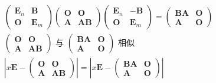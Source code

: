 \documentclass{article}
\begin{document}
				$$
				\begin{gathered}
					\left(\begin{array}{cc}
						\boldsymbol E_{n} & \boldsymbol B \\
						\boldsymbol O & \boldsymbol E_{m}
					\end{array}\right)\left(\begin{array}{cc}
						\boldsymbol O & \boldsymbol O \\
						\boldsymbol A & \boldsymbol A \boldsymbol B
					\end{array}\right)\left(\begin{array}{cc}
						\boldsymbol E_{n} & -\boldsymbol B \\
						\boldsymbol O & \boldsymbol E_{m}
					\end{array}\right)=\left(\begin{array}{cc}
						\boldsymbol B \boldsymbol A & \boldsymbol O \\
						\boldsymbol A & \boldsymbol O
					\end{array}\right) \\
					\left(\begin{array}{cc}
						\boldsymbol O & \boldsymbol O \\
						\boldsymbol A & \boldsymbol A \boldsymbol B
					\end{array}\right) \text { 与 }\left(\begin{array}{cc}
						\boldsymbol B \boldsymbol A & \boldsymbol O \\
						\boldsymbol A & \boldsymbol O
					\end{array}\right) \text { 相似 } \\
					\left|x \boldsymbol E-\left(\begin{array}{cc}
						\boldsymbol O & \boldsymbol O \\
						\boldsymbol A & \boldsymbol A \boldsymbol B
					\end{array}\right)\right|=\left|x \boldsymbol E-\left(\begin{array}{cc}
						\boldsymbol B \boldsymbol A &\boldsymbol  O \\
						\boldsymbol A & \boldsymbol O
					\end{array}\right)\right|
				\end{gathered}
				$$
\end{document}
